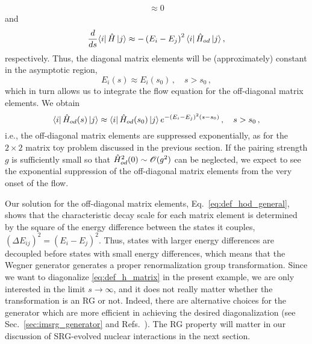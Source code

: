 {\begin{align}
  \approx0
\end{align}
and
\begin{align}
   \frac{d {}} {d {s}} \langle{i}|\,{\hat{H}}\,|{j}\rangle
  \approx-\left(E_i-E_j\right)^2\langle{i}|\,{\hat{H}_{od}}\,|{j}\rangle\,,
\end{align}
respectively. Thus, the diagonal matrix elements will be (approximately)
constant in the asymptotic region,
\begin{equation}
  E_i(s) \approx E_i(s_0)\,,\quad s>s_0\,,
\end{equation}
which in turn allows us to integrate the flow equation for the off-diagonal
matrix elements. We obtain
\begin{equation}\label{eq:def_hod_general}
  \matrixe{i}{\HO_{od}(s)}{j} \approx \matrixe{i}{\HO_{od}(s_0)}{j}\,e^{-(E_i-E_j)^2 (s-s_0)}\,, \quad s>s_0\,,
\end{equation}
i.e., the off-diagonal matrix elements are suppressed exponentially, as for the
$2\times2$ matrix toy problem discussed in the previous section. If the pairing
strength $g$ is sufficiently small so that $\hat{H}^2_{od}(0)\sim \mathcal{O}(g^2)$ can 
be neglected, we expect to see the exponential suppression of the off-diagonal 
matrix elements from the very onset of the flow. 

Our solution for the off-diagonal matrix elements, Eq.~\eqref{eq:def_hod_general},
shows that the characteristic decay scale for each matrix element is determined 
by the square of the energy difference between the states it couples, 
$(\Delta E_{ij})^2 = (E_i-E_j)^2$. Thus, states with larger energy differences
are decoupled before states with small energy differences, which means that 
the Wegner generator generates a proper renormalization group transformation.
Since we want to diagonalize \eqref{eq:def_h_matrix} in the present example,
we are only interested in the limit $s\to\infty$, and it does not really matter
whether the transformation is an RG or not. Indeed, there are alternative choices
for the generator which are more efficient in achieving the desired diagonalization
(see Sec.~\ref{sec:imsrg_generator} and Refs.~\cite{Hergert:2016jk,Hergert:2017kx}).
The RG property will matter in our discussion of SRG-evolved nuclear interactions 
in the next section.

%
%
}

